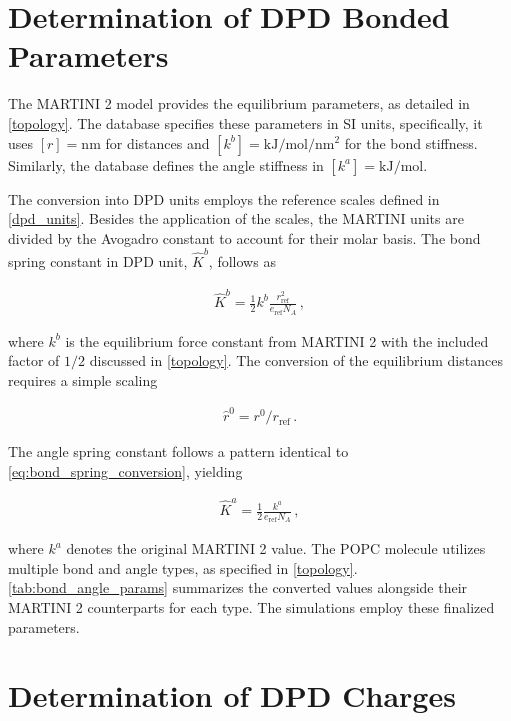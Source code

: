 \documentclass[
    11pt,
    a4paper,
    oneside,        %
    BCOR=10mm,      %
    parskip=half,   %
    listof=nototoc,   %
    bibliography=totoc %
]{scrreprt}
\begin{document}
\section{Determination of DPD Bonded Parameters}\label{sec:dpd_bond_params}

The MARTINI 2 model provides the equilibrium parameters, as detailed in \cref{topology}. The database \cite{Martini,lipidome_paper} specifies these parameters in SI units, specifically, it uses $[r] = \si{\nano\m}$ for distances and $[k^b] = \si{\kilo\J\per\mol\per\nano\m\squared}$ for the bond stiffness. Similarly, the database defines the angle stiffness in $[k^a] = \si{\kilo\J\per\mol}$.

The conversion into DPD units employs the reference scales defined in \cref{dpd_units}. Besides the application of the scales, the MARTINI units are divided by the Avogadro constant to account for their molar basis. The bond spring constant in DPD unit, $\hat{K}^b$, follows as 

\begin{align}
    \hat{K}^b = \frac{1}{2} k^b \frac{r_{\text{ref}}^2}{e_{\text{ref}}N_A}\, , \label{eq:bond_spring_conversion}
\end{align}

where $k^b$ is the equilibrium force constant from MARTINI 2 with the included factor of $1/2$ discussed in \cref{topology}. The conversion of the equilibrium distances requires a simple scaling

\begin{align}
    \hat{r}^0 = r^0/r_{\text{ref}}\, .
\end{align}

The angle spring constant follows a pattern identical to \cref{eq:bond_spring_conversion}, yielding

\begin{align}
    \hat{K}^a = \frac{1}{2}  \frac{k^a}{e_{\text{ref}}N_A}\, ,
\end{align}

where $k^a$ denotes the original MARTINI 2 value. The POPC molecule utilizes multiple bond and angle types, as specified in \cref{topology}. \cref{tab:bond_angle_params} summarizes the converted values alongside their MARTINI 2 counterparts for each type. The simulations employ these finalized parameters. 

\section{Determination of DPD Charges}
\end{document}
